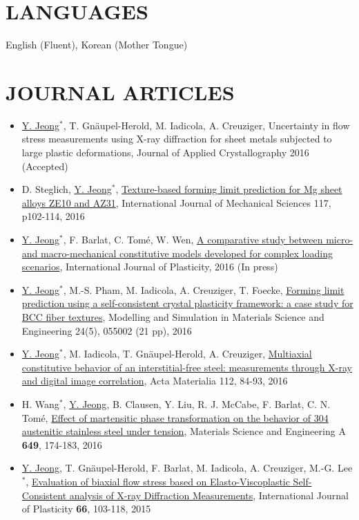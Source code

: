 \documentclass{res}
\begin{document}
\begin{resume}
  \section{LANGUAGES}
  English (Fluent), Korean (Mother Tongue)

  \section{JOURNAL ARTICLES}
  \begin{itemize}
  \item \underline{Y. Jeong}$^*$, T. Gn\"{a}upel-Herold, M. Iadicola, A. Creuziger, {Uncertainty in flow stress measurements using X-ray diffraction for sheet metals subjected to large plastic deformations}, Journal of Applied Crystallography 2016 (Accepted)
  \item D. Steglich, \underline{Y. Jeong}$^*$, \href{http://dx.doi.org/10.1016/j.ijmecsci.2016.08.013}{Texture-based forming limit prediction for Mg sheet alloys ZE10 and AZ31}, International Journal of Mechanical Sciences 117, p102-114, 2016
  \item \underline{Y. Jeong}$^*$, F. Barlat, C. Tom\'{e}, W. Wen, \href{http://dx.doi.org/10.1016/j.ijplas.2016.07.015}{A comparative study between micro- and macro-mechanical constitutive models developed for complex loading scenarios}, International Journal of Plasticity, 2016 (In press)
  \item \underline{Y. Jeong}$^*$, M.-S. Pham, M. Iadicola, A. Creuziger, T. Foecke, \href{http://dx.doi.org/10.1088/0965-0393/24/5/055005}{Forming limit prediction using a self-consistent crystal plasticity framework: a case study for BCC fiber textures}, Modelling and Simulation in Materials Science and Engineering 24(5), 055002 (21 pp), 2016
  \item \underline{Y. Jeong}$^*$, M. Iadicola, T. Gn\"{a}upel-Herold, A. Creuziger, \href{http://dx.doi.org/10.1016/j.actamat.2016.04.013}{Multiaxial constitutive behavior of an interstitial-free steel: measurements through X-ray and digital image correlation}, Acta Materialia 112, 84-93, 2016
  \item H. Wang$^*$, \underline{Y. Jeong}, B. Clausen, Y. Liu, R. J. McCabe, F. Barlat, C. N. Tom\'{e}, \href{http://dx.doi.org/10.1016/j.msea.2015.09.108}{Effect of martensitic phase transformation on the behavior of 304 austenitic stainless steel under tension}, Materials Science and Engineering A {\bf 649}, 174-183, 2016
  \item \underline{Y. Jeong}, T. Gn\"{a}upel-Herold, F. Barlat, M. Iadicola, A. Creuziger, M.-G. Lee$^*$, \href{http://dx.doi.org/10.1016/j.ijplas.2014.06.009}{Evaluation of biaxial flow stress based on Elasto-Viscoplastic Self-Consistent analysis of X-ray Diffraction Measurements}, International Journal of Plasticity {\bf 66}, 103-118, 2015

\end{itemize}
\end{resume}
\end{document}
